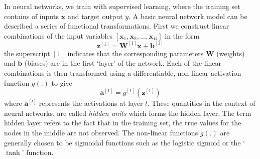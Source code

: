\documentclass[12pt]{report}
\numberwithin{equation}{section}
\begin{document}
In neural networks, we train with supervised learning, where the training set contains of inputs $\bm{x}$ and target output $y$. A basic neural network model  can be described a series of functional transformations. First we construct linear combinations of the input variables $[\bm{x}_1,\bm{x}_2,\hdots,\bm{x}_D]$ in the form
\begin{equation}\label{z1}
\bm{z}^{[1]} = \bm{W}^{[1]}\bm{x} + \bm{b}^{[1]}
\end{equation}
the superscript $[1]$ indicates that the corresponding parameters $\bm{W}$ (weights) and $\bm{b}$ (biases) are in the first `layer' of the network. Each of the linear combinations is then transformed using a differentiable, non-linear activation function $g(.)$ to give
\begin{equation}\label{a1}
\bm{a}^{[1]} = g^{[1]}(\bm{z}^{[1]})
\end{equation}
where $\bm{a}^{[l]}$ represents the activations at layer $l$. These quantities in the context of neural networks, are called \textit{hidden units} which forms the hidden layer, The term hidden layer refers to the fact that in the training set, the true values for the nodes in the middle are not observed. The non-linear functions $g(.)$ are generally chosen to be sigmoidal functions such as the logistic sigmoid or the `$\tanh$' function. 
\end{document}
